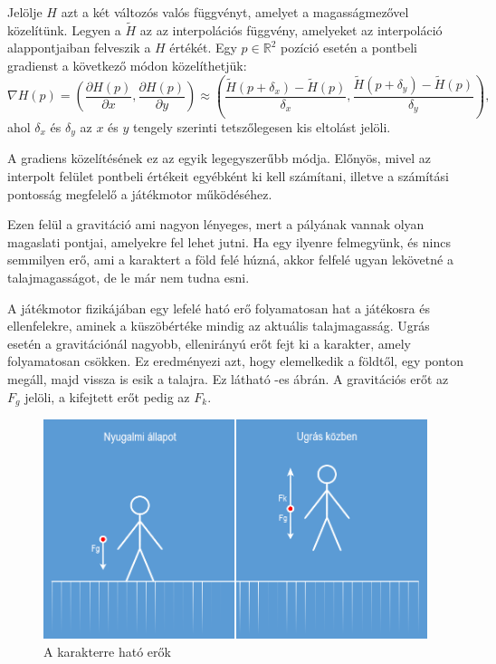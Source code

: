 Jelölje $H$ azt a két változós valós függvényt, amelyet a magasságmezővel közelítünk. Legyen a $\widetilde{H}$ az az interpolációs függvény, amelyeket az interpoláció alappontjaiban felveszik a $H$ értékét. Egy $p \in \mathbb{R}^2$ pozíció esetén a pontbeli gradienst a következő módon közelíthetjük:
$$
\nabla H(p) =
\left( \dfrac{\partial H(p)}{\partial x}, \dfrac{\partial H(p)}{\partial y} \right)
\approx
\left(
\dfrac{\widetilde{H}(p + \delta_x) - \widetilde{H}(p)}{\delta_x},
\dfrac{\widetilde{H}(p + \delta_y) - \widetilde{H}(p)}{\delta_y}
\right),
$$
ahol $\delta_x$ és $\delta_y$ az $x$ és $y$ tengely szerinti tetszőlegesen kis eltolást jelöli.

A gradiens közelítésének ez az egyik legegyszerűbb módja. Előnyös, mivel az interpolt felület pontbeli értékeit egyébként ki kell számítani, illetve a számítási pontosság megfelelő a játékmotor működéséhez.

Ezen felül a gravitáció ami nagyon lényeges, mert a pályának vannak olyan magaslati pontjai, amelyekre fel lehet jutni. Ha egy ilyenre felmegyünk, és nincs semmilyen erő, ami a karaktert a föld felé húzná, akkor felfelé ugyan lekövetné a talajmagasságot, de le már nem tudna esni.

A játékmotor fizikájában egy lefelé ható erő folyamatosan hat a játékosra és ellenfelekre, aminek a küszöbértéke mindig az aktuális talajmagasság. Ugrás esetén a gravitációnál nagyobb, ellenirányú erőt fejt ki a karakter, amely folyamatosan csökken. Ez eredményezi azt, hogy elemelkedik a földtől, egy ponton megáll, majd vissza is esik a talajra. Ez látható -es ábrán. A gravitációs erőt az $F_g$ jelöli, a kifejtett erőt pedig az $F_k$.

\begin{figure}[h]
\centering
\includegraphics[scale=0.6]{kepek/gravity.png}
\caption{A karakterre ható erők}
\label{fig:gravity}
\end{figure}

